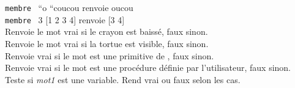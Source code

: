  \texttt{membre} \ {}{}``o {}``coucou renvoie oucou\\
 \texttt{membre} \ 3 {[}1 2 3 4{]} renvoie {[}3 4{]} \\
 Renvoie le mot vrai si le crayon est baissé, faux sinon.\\
Renvoie le mot vrai si la tortue est visible, faux sinon.\\
 Renvoie vrai si le mot est une primitive de \xlogo, faux sinon.\\
Renvoie vrai si le mot est une procédure définie par l'utilisateur, faux sinon.\\
 Teste si \textit{mot1} est une variable. Rend vrai ou faux selon les cas.\\

